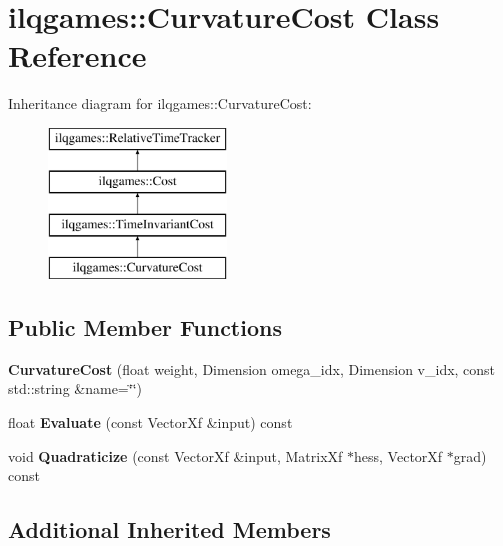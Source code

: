 \hypertarget{classilqgames_1_1_curvature_cost}{}\section{ilqgames\+:\+:Curvature\+Cost Class Reference}
\label{classilqgames_1_1_curvature_cost}
Inheritance diagram for ilqgames\+:\+:Curvature\+Cost\+:\begin{figure}[H]
\begin{center}
\leavevmode
\includegraphics[height=4.000000cm]{classilqgames_1_1_curvature_cost}
\end{center}
\end{figure}
\subsection*{Public Member Functions}
\begin{DoxyCompactItemize}
\item 
{\bfseries Curvature\+Cost} (float weight, Dimension omega\+\_\+idx, Dimension v\+\_\+idx, const std\+::string \&name=\char`\"{}\char`\"{})\hypertarget{classilqgames_1_1_curvature_cost_af3cef5c86cf6412de31496c1f7cc074a}{}\label{classilqgames_1_1_curvature_cost_af3cef5c86cf6412de31496c1f7cc074a}

\item 
float {\bfseries Evaluate} (const Vector\+Xf \&input) const \hypertarget{classilqgames_1_1_curvature_cost_a112ce04ef70a60c83d80a3de01108248}{}\label{classilqgames_1_1_curvature_cost_a112ce04ef70a60c83d80a3de01108248}

\item 
void {\bfseries Quadraticize} (const Vector\+Xf \&input, Matrix\+Xf $\ast$hess, Vector\+Xf $\ast$grad) const \hypertarget{classilqgames_1_1_curvature_cost_af35cbf73cd158328d60396d7411e8516}{}\label{classilqgames_1_1_curvature_cost_af35cbf73cd158328d60396d7411e8516}

\end{DoxyCompactItemize}
\subsection*{Additional Inherited Members}


